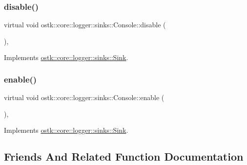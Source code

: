 \subsubsection{\texorpdfstring{disable()}{disable()}}
{\footnotesize\ttfamily virtual void ostk\+::core\+::logger\+::sinks\+::\+Console\+::disable (\begin{DoxyParamCaption}{ }\end{DoxyParamCaption})\hspace{0.3cm}{\ttfamily [override]}, {\ttfamily [virtual]}}



Implements \hyperlink{classostk_1_1core_1_1logger_1_1sinks_1_1_sink_a3e347ffee80e3c2ee50ff0edf9265115}{ostk\+::core\+::logger\+::sinks\+::\+Sink}.

\mbox{\label{classostk_1_1core_1_1logger_1_1sinks_1_1_console_a684825bbab717a14f9c83712c054d1d9}} 
\subsubsection{\texorpdfstring{enable()}{enable()}}
{\footnotesize\ttfamily virtual void ostk\+::core\+::logger\+::sinks\+::\+Console\+::enable (\begin{DoxyParamCaption}{ }\end{DoxyParamCaption})\hspace{0.3cm}{\ttfamily [override]}, {\ttfamily [virtual]}}



Implements \hyperlink{classostk_1_1core_1_1logger_1_1sinks_1_1_sink_a355c81571a4a34bb162c1dc5fe631c89}{ostk\+::core\+::logger\+::sinks\+::\+Sink}.



\subsection{Friends And Related Function Documentation}
\mbox{\label{classostk_1_1core_1_1logger_1_1sinks_1_1_console_aeda242f6bb74cf8f4003eb67666e9118}} 
